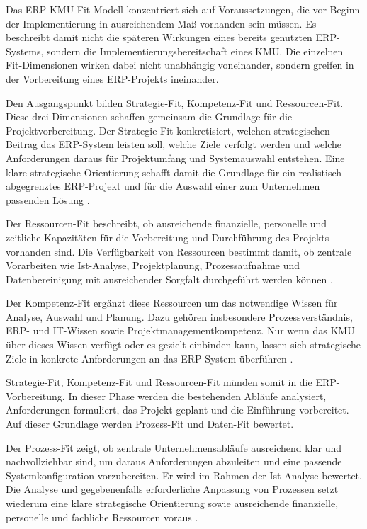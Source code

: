 
Das ERP-KMU-Fit-Modell konzentriert sich auf Voraussetzungen, die vor Beginn
der Implementierung in ausreichendem Maß vorhanden sein müssen. Es beschreibt
damit nicht die späteren Wirkungen eines bereits genutzten ERP-Systems, sondern
die Implementierungsbereitschaft eines KMU. Die einzelnen Fit-Dimensionen
wirken dabei nicht unabhängig voneinander, sondern greifen in der Vorbereitung
eines ERP-Projekts ineinander.

Den Ausgangspunkt bilden Strategie-Fit, Kompetenz-Fit und Ressourcen-Fit.
Diese drei Dimensionen schaffen gemeinsam die Grundlage für die
Projektvorbereitung. Der Strategie-Fit konkretisiert, welchen strategischen
Beitrag das ERP-System leisten soll, welche Ziele verfolgt werden und welche
Anforderungen daraus für Projektumfang und Systemauswahl entstehen. Eine klare
strategische Orientierung schafft damit die Grundlage für ein realistisch
abgegrenztes ERP-Projekt und für die Auswahl einer zum Unternehmen passenden
Lösung \parencite{Leyh2015,Jha2008}.

Der Ressourcen-Fit beschreibt, ob ausreichende finanzielle, personelle und
zeitliche Kapazitäten für die Vorbereitung und Durchführung des Projekts
vorhanden sind. Die Verfügbarkeit von Ressourcen bestimmt damit, ob zentrale Vorarbeiten wie Ist-Analyse,
Projektplanung, Prozessaufnahme und Datenbereinigung mit ausreichender
Sorgfalt durchgeführt werden können \parencite{Leyh2015,Jha2008}.

Der Kompetenz-Fit ergänzt diese Ressourcen um das notwendige Wissen für
Analyse, Auswahl und Planung. Dazu gehören insbesondere Prozessverständnis,
ERP- und IT-Wissen sowie Projektmanagementkompetenz. Nur wenn das KMU über
dieses Wissen verfügt oder es gezielt einbinden kann, lassen sich strategische
Ziele in konkrete Anforderungen an das ERP-System überführen
\parencite{Leyh2015,Jha2008}.

Strategie-Fit, Kompetenz-Fit und Ressourcen-Fit münden somit in die
ERP-Vorbereitung. In dieser Phase werden die bestehenden Abläufe analysiert,
Anforderungen formuliert, das Projekt geplant und die Einführung vorbereitet.
Auf dieser Grundlage werden Prozess-Fit und Daten-Fit bewertet.

Der Prozess-Fit zeigt, ob zentrale Unternehmensabläufe ausreichend klar und
nachvollziehbar sind, um daraus Anforderungen abzuleiten und eine passende
Systemkonfiguration vorzubereiten. Er wird im Rahmen der Ist-Analyse
bewertet. Die Analyse und gegebenenfalls erforderliche Anpassung von Prozessen
setzt wiederum eine klare strategische Orientierung sowie ausreichende
finanzielle, personelle und fachliche Ressourcen voraus \parencite{Leyh2015}.

